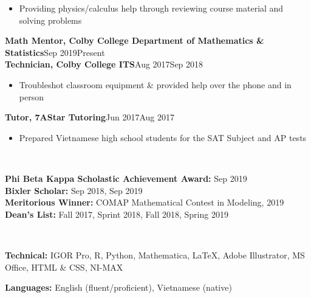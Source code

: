 \documentclass[letter, 9pt]{article}
\newcommand{\longunderline}[1]{\uline{#1\hfill\mbox{}}}
\begin{document}
	\begin{itemize}[noitemsep, nolistsep]
		\item Providing physics/calculus help through reviewing course material and solving problems
	\end{itemize}
	\textbf{Math Mentor, Colby College Department of Mathematics \& Statistics}\hfill Sep 2019\textemdash Present\\	  
	\noindent \textbf{Technician, Colby College ITS}\hfill Aug 2017\textemdash Sep 2018
	\begin{itemize}[noitemsep, nolistsep]
		\item Troubleshot classroom equipment \& provided help over the phone and in person
	\end{itemize}
	  \textbf{Tutor, 7AStar Tutoring}\hfill Jun 2017\textemdash Aug 2017
	\begin{itemize}[noitemsep, nolistsep]
		\item Prepared Vietnamese high school students for the SAT Subject and AP tests\\
	\end{itemize}

	\vspace{-7pt} \noindent \longunderline{\normalsize{{\color{colby}{\textbf{HONORS \& AWARDS}}}}}\\ \vspace{-7pt}
			
		\noindent \textbf{Phi Beta Kappa Scholastic Achievement Award:} Sep 2019 \\
		\noindent \textbf{Bixler Scholar:} Sep 2018, Sep 2019\\
		\noindent \textbf{Meritorious Winner:} {COMAP} Mathematical Contest in Modeling, 2019\\
		\noindent \textbf{Dean's List:} Fall 2017, Sprint 2018, Fall 2018, Spring 2019\\
		 \vspace{-7pt}
	
	
	\noindent \longunderline{\normalsize{{}}}
	\\ \vspace{-7pt}
	
	\noindent \textbf{Technical:} IGOR Pro, R, Python, Mathematica, \LaTeX{}, Adobe Illustrator, MS Office,  HTML \& CSS, NI-MAX
	
	\noindent \textbf{Languages:} English (fluent/proficient), Vietnamese (native)\\
	\vspace{-7pt}
	
\end{document}
